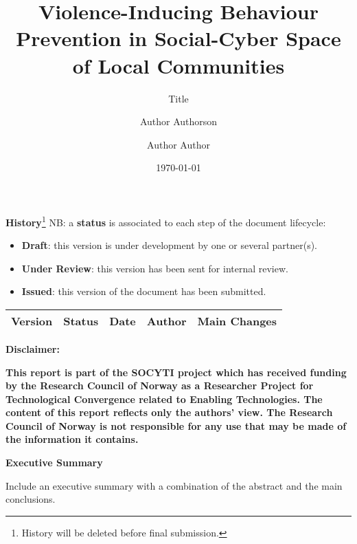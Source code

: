 \documentclass{socyti}
\title{Violence-Inducing Behaviour Prevention in Social-Cyber Space of Local Communities}
\author[1]{Author Authorson}
\author[2]{Author Author}
\affil[1]{Organisation}
\affil[2]{Organisation}
\date{\today}
\subtitle{Title}
\begin{document}
    \maketitle

    \textbf{History}\footnote{History will be deleted before final submission.}
    NB: a \textbf{status} is associated to each step of the document lifecycle:
    \begin{itemize}
        \item \textbf{Draft}: this version is under development by one or several partner(s).
        \item \textbf{Under Review}: this version has been sent for internal review.
        \item \textbf{Issued}: this version of the document has been submitted.
    \end{itemize}

    \begin{table}[h]
        \begin{tabularx}{\textwidth}{|X|X|X|X|X|}
            \hline
            \rowcolor{rowgray}
            Version & Status & Date & Author & Main Changes \\
            \hline
        \end{tabularx}
    \end{table}

    \textbf{Disclaimer:}

    \textbf{This report is part of the SOCYTI project which has received funding by the Research Council of Norway as a Researcher Project for Technological Convergence related to Enabling Technologies. The content of this report reflects only the authors’ view. The Research Council of Norway is not responsible for any use that may be made of the information it contains.}

    \newpage

    {\Large\textbf{Executive Summary}}

    Include an executive summary with a combination of the abstract and the main conclusions.

    \newpage

    \tableofcontents

    \newpage

    \listoffigures

    \newpage
    
    \listoftables

    \newpage

\end{document}
